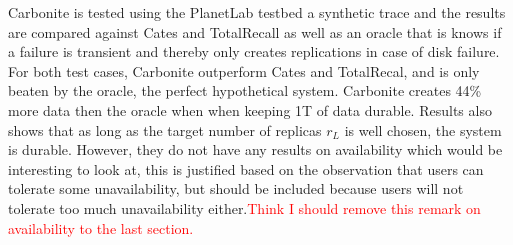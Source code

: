\documentclass{article}
\begin{document}
\noindent Carbonite is tested using the PlanetLab testbed a synthetic trace and the results are compared against Cates and TotalRecall as well as an oracle that is knows if a failure is transient and thereby only creates replications in case of disk failure. For both test cases, Carbonite outperform Cates and TotalRecal, and is only beaten by the oracle, the perfect hypothetical system. Carbonite creates 44\% more data then the oracle when when keeping 1T of data durable. Results also shows that as long as the target number of replicas $r_L$ is well chosen, the system is durable. However, they do not have any results on availability which would be interesting to look at, this is justified based on the observation that users can tolerate some unavailability, but should be included because users will not tolerate too much unavailability either.\textcolor{red}{Think I should remove this remark on availability to the last section.}\\

\noindent 
\end{document}
